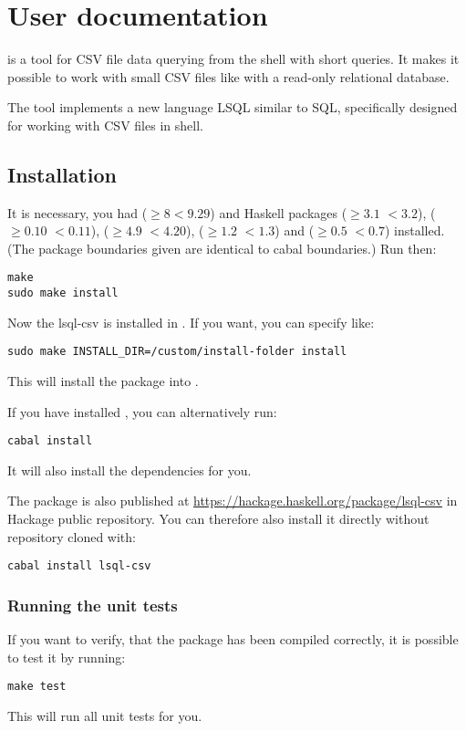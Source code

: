 \chapter{User documentation}
 is a tool for CSV file data querying from the shell with short queries. It makes it possible to work with small CSV files like with a read-only relational database.

The tool implements a new language LSQL similar to SQL, specifically designed for working with CSV files in shell. 

\section{Installation}
It is necessary, you had  ($\geq 8 <9.29$) and Haskell packages  ($\geq 3.1$ $<3.2$),  ($\geq 0.10$ $<0.11$), 
 ($\geq 4.9$ $<4.20$),  ($\geq 1.2$ $<1.3$) and  ($\geq 0.5$ $<0.7$)
 installed. (The package boundaries given are identical to cabal boundaries.) Run then:

\begin{verbatim}
make
sudo make install
\end{verbatim}

Now the lsql-csv is installed in . If you want, you can specify  like:
\begin{verbatim}
sudo make INSTALL_DIR=/custom/install-folder install
\end{verbatim}
This will install the package into .

If you have installed , you can alternatively run:
\begin{verbatim}
cabal install
\end{verbatim}
It will also install the dependencies for you.

The package is also published at \url{https://hackage.haskell.org/package/lsql-csv} in Hackage public repository. You can therefore also install it directly without repository cloned with:
\begin{verbatim}
cabal install lsql-csv
\end{verbatim}

\subsection{Running the unit tests}
If you want to verify, that the package has been compiled correctly, it is possible to test it by running:
\begin{verbatim}
make test
\end{verbatim}
This will run all unit tests for you.

